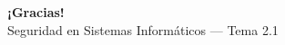 \documentclass[aspectratio=169,11pt]{beamer}
\begin{document}
\begin{frame}[plain]
  \begin{center}
    {\Huge\bfseries\color{uznavy} ¡Gracias!}\\[1em]
    {\large Seguridad en Sistemas Informáticos --- Tema 2.1}
  \end{center}
\end{frame}

\end{document}

